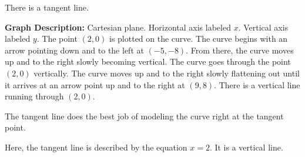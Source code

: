 \documentclass{ximera}
\begin{document}
There is a tangent line.




\begin{image}
\end{image}


\textcolor{gray!90}{\textbf{Graph Description:} Cartesian plane. Horizontal axis labeled $x$. Vertical axis labeled $y$. The point $(2,0)$ is plotted on the curve.  The curve begins with an arrow pointing down and to the left at $(-5,-8)$. From there, the curve moves up and to the right slowly becoming vertical. The curve goes through the point $(2,0)$ vertically. The curve moves up and to the right slowly flattening out until it arrives at an arrow point up and to the right at $(9,8)$. There is a vertical line running through $(2,0)$.}  









The tangent line does the best job of modeling the curve right at the tangent point. 

Here, the tangent line is described by the equation $x = 2$. It is a vertical line. 
\end{document}
